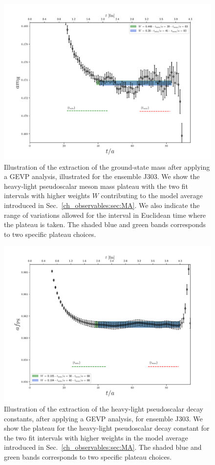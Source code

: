 \begin{figure}
  	\centering
  	\includegraphics[scale=0.5]{./cap6/figs/matching/m8_plateau.pdf}
  	\caption{Illustration of the extraction of the ground-state mass after applying a GEVP analysis, illustrated for the ensemble J303. We show the heavy-light pseudoscalar meson mass plateau with the two fit intervals with higher weights $W$ contributing to the model average introduced in Sec.~\ref{ch_observables:sec:MA}. We also indicate the range of variations allowed for the interval in Euclidean time where the plateau is taken. The shaded blue and green bands corresponds to two specific plateau choices.} 
\label{fig:meff_plateau} 
\end{figure}

\begin{figure}
	\centering
	\includegraphics[scale=0.5]{./cap6/figs/fds/f8_plateau.pdf}
	\caption{Illustration of the extraction of the heavy-light pseudoscalar decay constants, after applying a GEVP analysis, for ensemble J303. We show the plateau for the heavy-light pseudoscalar decay constant for the two fit intervals with higher weights in the model average introduced in Sec.~\ref{ch_observables:sec:MA}. The shaded blue and green bands corresponds to two specific plateau choices. }
	\label{fig:decay_plateau} 
\end{figure}